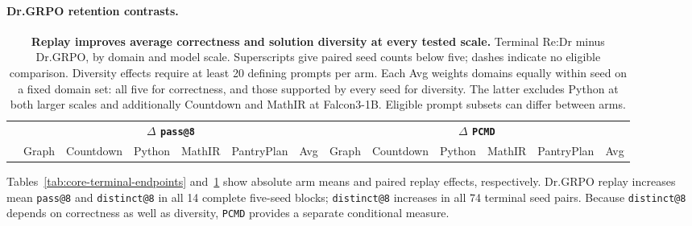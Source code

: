 \documentclass{article}
\makeatletter
\newcommand{\1}{\mathbf 1}
\newcommand{\pmd}{\texttt{PCMD}}
\newcommand{\distk}{\texttt{distinct@8}}
\theoremstyle{remark}
\theoremstyle{definition}
\theoremstyle{plain}
\makeatother
\begin{document}
\paragraph{Dr.GRPO retention contrasts.}
\label{app:retention-numerical-detail}

\begin{table}[!tbp]
  \centering
  \caption{\textbf{Replay improves average correctness and solution diversity at every tested scale.}
  Terminal Re:Dr minus Dr.GRPO, by domain and model scale. Superscripts give
  paired seed counts below five; dashes indicate no eligible comparison.
  Diversity effects require at least 20 defining prompts per arm. Each Avg
  weights domains equally within seed on a fixed domain set: all five for
  correctness, and those supported by every seed for diversity. The latter
  excludes Python at both larger scales and additionally Countdown and MathIR
  at Falcon3-1B. Eligible prompt subsets can differ between arms.}

\label{tab:cross-scale-terminal-effects}
  \scriptsize
  \setlength{\tabcolsep}{1.4pt}
  \renewcommand{\arraystretch}{0.92}
  \begin{tabular}{@{}l*{12}{r}@{}}
    \toprule
    & \multicolumn{6}{c}{\textbf{$\Delta$ \texttt{pass@8}}}
      & \multicolumn{6}{c}{\textbf{$\Delta$ \pmd{}}} \\
    \cmidrule(lr){2-7}\cmidrule(l){8-13}
    & Graph & Countdown & Python & MathIR & PantryPlan & Avg
      & Graph & Countdown & Python & MathIR & PantryPlan & Avg \\
    \midrule
    
  \end{tabular}
\end{table}

Tables~\ref{tab:core-terminal-endpoints} and~\ref{tab:cross-scale-terminal-effects}
show absolute arm means and paired replay effects, respectively. Dr.GRPO
replay increases mean \texttt{pass@8} and \distk{} in all 14 complete
five-seed blocks; \distk{} increases in all 74 terminal seed pairs.
Because \distk{} depends on correctness as well as diversity, \pmd{} provides
a separate conditional measure.
\end{document}
